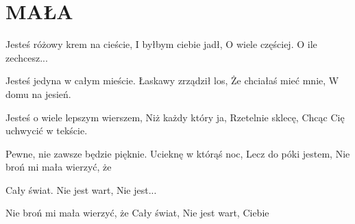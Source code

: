 \documentclass[../../../songbook.tex]{subfiles}
\begin{document}
\TabPositions{8cm} %
\section*{MAŁA}
{}
\vspace{0.5cm}
Jesteś różowy krem na cieście,	 \newline
I byłbym ciebie jadł,			 \newline
O wiele częściej. 				\newline
O ile zechcesz...				 \newline

Jesteś jedyna w całym mieście.				\newline
Łaskawy zrządził los,				\newline
Że chciałaś mieć mnie,				\newline
W domu na jesień.				\newline

Jesteś o wiele lepszym wierszem,				\newline
Niż każdy który ja,				\newline
Rzetelnie sklecę,				\newline
Chcąc Cię uchwycić w tekście.				\newline

Pewne, nie zawsze będzie pięknie.				\newline
Ucieknę w którąś noc,				\newline
Lecz do póki jestem,				\newline
Nie broń mi mała wierzyć, że				\newline

\-\hspace{1cm} Cały świat.				\newline
\-\hspace{1cm} Nie jest wart,				\newline
\-\hspace{1cm} Nie jest...				\newline

\-\hspace{1cm} Nie broń mi mała wierzyć, że				\newline
\-\hspace{1cm} Cały świat,				\newline
\-\hspace{1cm} Nie jest wart,				\newline
\-\hspace{1cm} Ciebie				\newline
\end{document}
